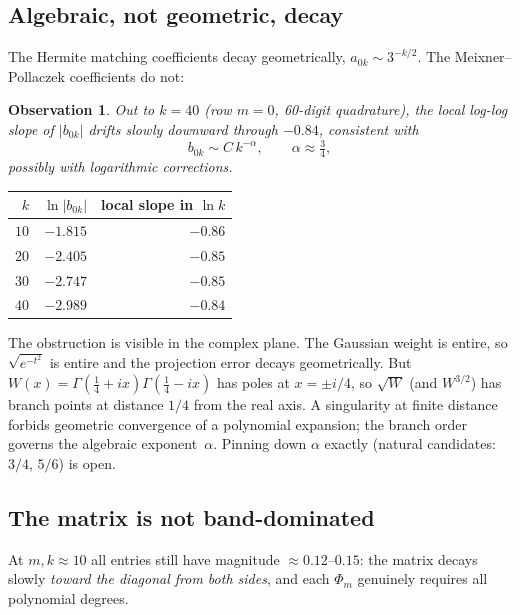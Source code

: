 \documentclass[11pt,a4paper]{article}
\theoremstyle{definition}
\theoremstyle{plain}
\newtheorem{observation}[definition]{Observation}
\begin{document}
\subsection{Algebraic, not geometric, decay}

The Hermite matching coefficients decay geometrically,
$a_{0k} \sim 3^{-k/2}$. The Meixner--Pollaczek coefficients do not:

\begin{observation}\label{obs:decay}
Out to $k = 40$ (row $m = 0$, 60-digit quadrature), the local log-log
slope of $|b_{0k}|$ drifts slowly downward through $-0.84$,
consistent with
\[
  b_{0k} \sim C\, k^{-\alpha}, \qquad \alpha \approx \tfrac34,
\]
possibly with logarithmic corrections.
\end{observation}

\begin{center}
\small
\begin{tabular}{rrr}
\toprule
$k$ & $\ln|b_{0k}|$ & local slope in $\ln k$ \\
\midrule
$10$ & $-1.815$ & $-0.86$ \\
$20$ & $-2.405$ & $-0.85$ \\
$30$ & $-2.747$ & $-0.85$ \\
$40$ & $-2.989$ & $-0.84$ \\
\bottomrule
\end{tabular}
\end{center}

The obstruction is visible in the complex plane. The Gaussian weight is
entire, so $\sqrt{e^{-t^2}}$ is entire and the projection error decays
geometrically. But
$W(x) = \Gamma(\tfrac14+ix)\Gamma(\tfrac14-ix)$ has poles at
$x = \pm i/4$, so $\sqrt{W}$ (and $W^{3/2}$) has branch points at
distance $1/4$ from the real axis. A singularity at finite distance
forbids geometric convergence of a polynomial expansion; the branch
order governs the algebraic exponent~$\alpha$. Pinning down $\alpha$
exactly (natural candidates: $3/4$, $5/6$) is open.

\subsection{The matrix is not band-dominated}

At $m, k \approx 10$ all entries still have magnitude
$\approx 0.12$--$0.15$: the matrix decays slowly \emph{toward the
diagonal from both sides}, and each $\Phi_m$ genuinely requires all
polynomial degrees.

\end{document}
